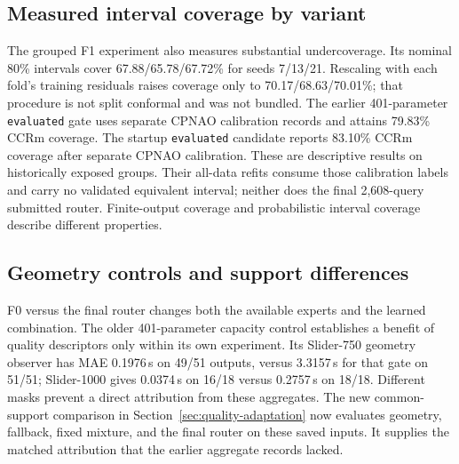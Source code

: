 \subsection{Measured interval coverage by variant}
The grouped F1 experiment also measures substantial undercoverage. Its nominal 80\% intervals cover 67.88/65.78/67.72\% for seeds 7/13/21. Rescaling with each fold's training residuals raises coverage only to 70.17/68.63/70.01\%; that procedure is not split conformal and was not bundled. The earlier 401-parameter \texttt{evaluated} gate uses separate CPNAO calibration records and attains 79.83\% CCRm coverage. The startup \texttt{evaluated} candidate reports 83.10\% CCRm coverage after separate CPNAO calibration. These are descriptive results on historically exposed groups. Their all-data refits consume those calibration labels and carry no validated equivalent interval; neither does the final 2,608-query submitted router. Finite-output coverage and probabilistic interval coverage describe different properties. 


\subsection{Geometry controls and support differences}
\label{app:geometry-attribution}
F0 versus the final router changes both the available experts and the learned combination. The older 401-parameter capacity control establishes a benefit of quality descriptors only within its own experiment. Its Slider-750 geometry observer has MAE 0.1976\,s on 49/51 outputs, versus 3.3157\,s for that gate on 51/51; Slider-1000 gives 0.0374\,s on 16/18 versus 0.2757\,s on 18/18. Different masks prevent a direct attribution from these aggregates. The new common-support comparison in Section~\ref{sec:quality-adaptation} now evaluates geometry, fallback, fixed mixture, and the final router on these saved inputs. It supplies the matched attribution that the earlier aggregate records lacked. 
